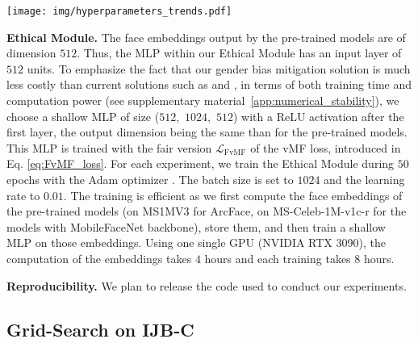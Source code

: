\documentclass[nohyperref]{article}
\theoremstyle{plain}
\theoremstyle{definition}
\theoremstyle{remark}
\begin{document}
\begin{figure*}[ht!]
\vspace{-0.2cm}
\hspace{-1cm}
    \texttt{[image: img/hyperparameters\_trends.pdf]}
    \vspace{-0.9cm}
    \caption{Fairness and evaluation metrics on IJB-C for the Ethical Module when one of the two hyperparameters is fixed. The FAR level defining the threshold $t$ is set to $10^{-3}$; the pre-trained model is ArcFace with a ResNet100 backbone. $\mathrm{FRR}@\mathrm{FAR}$ is expressed as a percentage (\%). The three versions of the Ethical Module presented in \autoref{tab:kappa_choice} are annotated with circles.}
    \label{fig:hyperparam_trends}
    \vspace{-0.1in}
\end{figure*}


{\bf Ethical Module.} The face embeddings output by the pre-trained models are of dimension $512$. Thus, the MLP within our Ethical Module has an input layer of $512$ units. To emphasize the fact that our gender bias mitigation solution is much less costly than current solutions such as \cite{mitigating_bias_RL} and \cite{dhar2021pass}, in terms of both training time and computation power (see supplementary material~\ref{app:numerical_stability}), we choose a shallow MLP of size ($512$,~$1024$,~$512$) with a ReLU activation after the first layer, the output dimension being the same than for the pre-trained models. This MLP is trained with the fair version $\mathcal{L}_{\text{FvMF}}$ of the vMF loss, introduced in Eq. \ref{eq:FvMF_loss}. For each experiment, we train the Ethical Module during $50$ epochs with the Adam optimizer \cite{adam}. The batch size is set to $1024$ and the learning rate to $0.01$. The training is efficient as we first compute the face embeddings of the pre-trained models (on MS1MV3 for ArcFace, on MS-Celeb-1M-v1c-r for the models with MobileFaceNet backbone), store them, and then train a shallow MLP on those embeddings. Using one single GPU (NVIDIA RTX 3090), the computation of the embeddings takes $4$ hours and each training takes $8$ hours.

{\bf Reproducibility.} We plan to release the code used to conduct our experiments.


\subsection{Grid-Search on IJB-C}\label{subsec:grid_search_ijbc}
\end{document}
